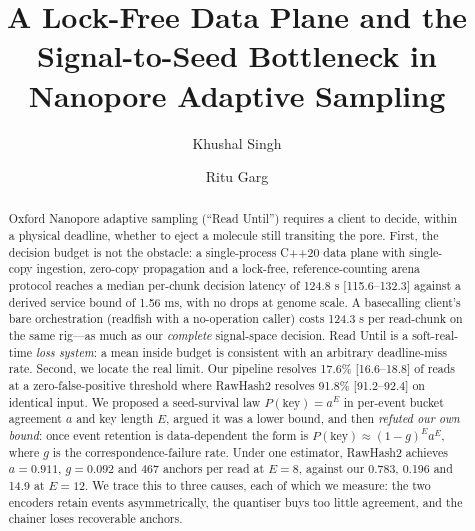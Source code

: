 \documentclass[runningheads]{llncs}
\begin{document}
\title{A Lock-Free Data Plane and the Signal-to-Seed Bottleneck in
Nanopore Adaptive Sampling}


\author{Khushal Singh \and Ritu Garg}


\maketitle

\begin{abstract}
Oxford Nanopore adaptive sampling (``Read Until'') requires a client to
decide, within a physical deadline, whether to eject a molecule still transiting the pore.
First, the decision budget is not the obstacle: a single-process C++20 data plane with
single-copy ingestion, zero-copy propagation and a lock-free, reference-counting arena
protocol reaches a median per-chunk decision latency of 124.8 \textmu{}s [115.6--132.3] against a
derived service bound of 1.56 ms, with no drops at genome scale. A basecalling client's bare
orchestration (readfish with a no-operation caller) costs 124.3 \textmu{}s per read-chunk on the same
rig---as much as our \emph{complete} signal-space decision. Read Until is a soft-real-time
\emph{loss system}: a mean inside budget is consistent with an arbitrary deadline-miss rate.
Second, we locate the real limit. Our pipeline resolves 17.6\% [16.6--18.8] of reads at a
zero-false-positive threshold where RawHash2 resolves 91.8\% [91.2--92.4] on identical
input. We proposed a seed-survival law
$P(\mathrm{key}) = a^{E}$ in per-event bucket agreement $a$ and key length $E$, argued it was
a lower bound, and then \emph{refuted our own bound}: once event retention is data-dependent
the form is $P(\mathrm{key}) \approx (1-g)^{E} a^{E}$, where $g$ is the correspondence-failure
rate. Under one estimator, RawHash2 achieves $a = 0.911$, $g = 0.092$ and
467 anchors per read at $E = 8$, against our 0.783, 0.196 and 14.9 at $E = 12$. We trace this
to three causes, each of which we measure: the two encoders retain events asymmetrically, the
quantiser buys too little agreement, and the chainer loses recoverable anchors.

\end{abstract}
\end{document}
